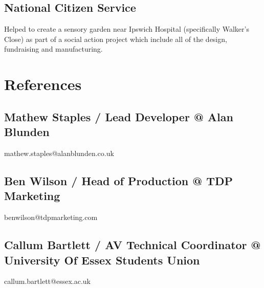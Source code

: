 \documentclass{article}
\begin{document}
\subsection{National Citizen Service} Helped to create a sensory garden near Ipswich Hospital (specifically Walker's Close) as part of a social action project which include all of the design, fundraising and manufacturing.

\section{References}

\subsection{Mathew Staples / Lead Developer @ Alan Blunden} mathew.staples@alanblunden.co.uk
\subsection{Ben Wilson / Head of Production @ TDP Marketing} benwilson@tdpmarketing.com 
\subsection{Callum Bartlett / AV Technical Coordinator @ University Of Essex Students Union} callum.bartlett@essex.ac.uk

\end{document}
